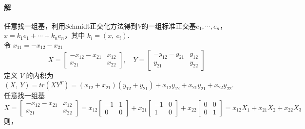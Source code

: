 \documentclass[12pt, a4paper, oneside, fontset=none]{ctexart}
\begin{document}
\paragraph*{解} 任意找一组基，利用Schmidt正交化方法得到$V$的一组标准正交基$e_1,\cdots,e_n$，$x = k_1e_1+
    \cdots+k_ne_n$，其中 $k_i = (x,\ e_i)$.\\
令 $x_{11} = -x_{12} - x_{21}$
\[
    X = \begin{bmatrix}
        -x_{12} - x_{21} & x_{12} \\
        x_{21}           & x_{22}
    \end{bmatrix},\quad Y = \begin{bmatrix}
        -y_{12} - y_{21} & y_{12} \\
        y_{21}           & y_{22}
    \end{bmatrix}
\]
定义 $V$ 的内积为 $(X,\ Y) = tr(XY^T) = (x_{12} + x_{21})(y_{12} + y_{21}) + x_{12}y_{12} + x_{21}y_{21} + x_{22}y_{22}$. \\
任意找一组基
\[
    X = \begin{bmatrix}
        -x_{12} - x_{21} & x_{12} \\
        x_{21}           & x_{22}
    \end{bmatrix} = x_{12}\begin{bmatrix}
        -1 & 1 \\
        0  & 0
    \end{bmatrix} + x_{21}\begin{bmatrix}
        -1 & 0 \\
        1  & 0
    \end{bmatrix} + x_{22}\begin{bmatrix}
        0 & 0 \\
        0 & 1
    \end{bmatrix} = x_{12}X_1 + x_{21}X_2 + x_{22}X_3
\]
则，
\end{document}
